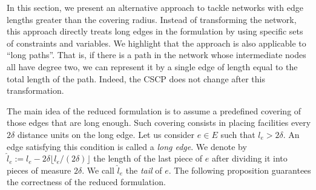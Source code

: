 In this section, we present an alternative approach to tackle networks with edge lengths greater than the covering radius. Instead of transforming the network, this approach directly treats long edges in the formulation by using specific sets of constraints and variables. We highlight that the approach is also applicable to ``long paths''. That is, if there is a path in the network whose  intermediate nodes all have degree two, we can represent it by a single edge of length equal to the total length of the path. Indeed, the CSCP does not change after this transformation.

The main idea of the reduced formulation is to assume a predefined covering of those edges that are long enough. Such covering consists in placing facilities every $2\delta$ distance units on the long edge. Let us consider $e\in E$ such that $l_e> 2\delta$. An edge satisfying this condition is called a \emph{long edge}. We denote by $\hat{l}_e:=l_e-2\delta\lfloor l_e/(2\delta) \rfloor$ the length of the last piece of $e$ after dividing it into pieces of measure $2\delta$. We call  $\hat{l}_e$ the \emph{tail} of $e$.  The following proposition guarantees the correctness of the reduced formulation.

